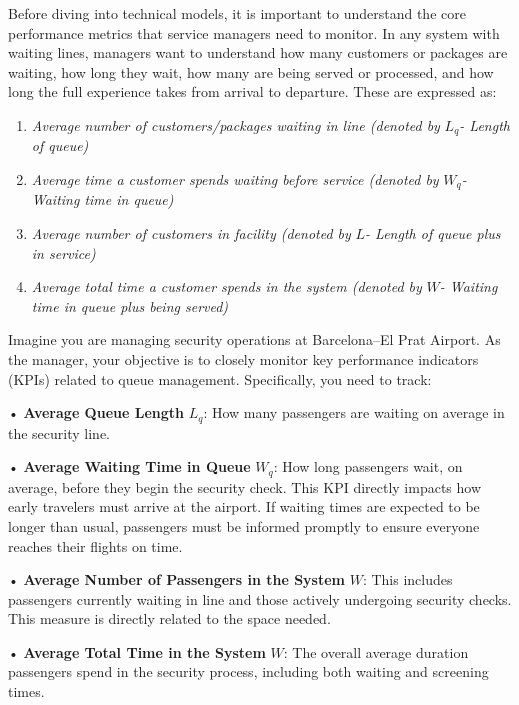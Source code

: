 \documentclass[
  letterpaper,
  DIV=11,
  numbers=noendperiod]{scrartcl}
\providecommand{\tightlist}{%
  \setlength{\itemsep}{0pt}\setlength{\parskip}{0pt}}
\begin{document}
Before diving into technical models, it is important to understand the
core performance metrics that service managers need to monitor. In any
system with waiting lines, managers want to understand how many
customers or packages are waiting, how long they wait, how many are
being served or processed, and how long the full experience takes from
arrival to departure. These are expressed as:

\begin{enumerate}
\def\labelenumi{\arabic{enumi}.}
\tightlist
\item
  \emph{Average number of customers/packages waiting in line (denoted
  by} \(L_q\)\emph{- Length of queue)}
\item
  \emph{Average time a customer spends waiting before service (denoted
  by} \(W_q\)\emph{- Waiting time in queue)}
\item
  \emph{Average number of customers in facility (denoted by}
  \(L\)\emph{- Length of queue plus in service)}
\item
  \emph{Average total time a customer spends in the system (denoted by}
  \(W\)\emph{- Waiting time in queue plus being served)}
\end{enumerate}

\begin{tcolorbox}[enhanced jigsaw, colbacktitle=quarto-callout-note-color!10!white, leftrule=.75mm, breakable, bottomtitle=1mm, title=\textcolor{quarto-callout-note-color}{\faInfo}\hspace{0.5em}{At the Airport- Barcelona Prat}, opacitybacktitle=0.6, toptitle=1mm, arc=.35mm, colback=white, rightrule=.15mm, left=2mm, colframe=quarto-callout-note-color-frame, titlerule=0mm, toprule=.15mm, bottomrule=.15mm, opacityback=0, coltitle=black]

Imagine you are managing security operations at Barcelona--El Prat
Airport. As the manager, your objective is to closely monitor key
performance indicators (KPIs) related to queue management. Specifically,
you need to track:

• \textbf{Average Queue Length} \(L_q\): How many passengers are waiting
on average in the security line.

• \textbf{Average Waiting Time in Queue} \(W_q\): How long passengers
wait, on average, before they begin the security check. This KPI
directly impacts how early travelers must arrive at the airport. If
waiting times are expected to be longer than usual, passengers must be
informed promptly to ensure everyone reaches their flights on time.

• \textbf{Average Number of Passengers in the System} \(W\): This
includes passengers currently waiting in line and those actively
undergoing security checks. This measure is directly related to the
space needed.

• \textbf{Average Total Time in the System} \(W\): The overall average
duration passengers spend in the security process, including both
waiting and screening times.

\end{tcolorbox}
\end{document}
